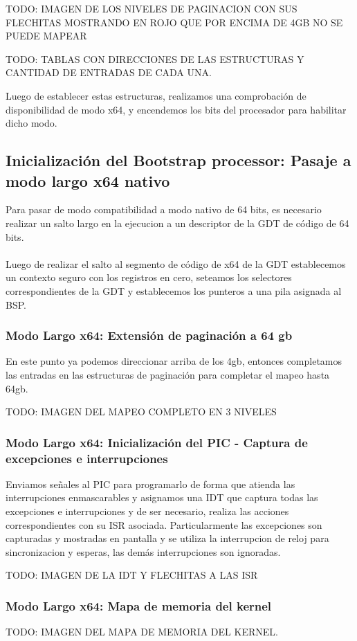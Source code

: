     TODO: IMAGEN DE LOS NIVELES DE PAGINACION CON SUS FLECHITAS MOSTRANDO EN ROJO QUE POR ENCIMA DE 4GB NO SE PUEDE MAPEAR

    TODO: TABLAS CON DIRECCIONES DE LAS ESTRUCTURAS Y CANTIDAD DE ENTRADAS DE CADA UNA.

	Luego de establecer estas estructuras, realizamos una comprobación de disponibilidad de modo x64, y encendemos los bits del procesador para habilitar dicho modo.

    \subsection{Inicialización del Bootstrap processor: Pasaje a modo largo x64 nativo}

    Para pasar de modo compatibilidad a modo nativo de 64 bits, es necesario realizar un salto largo en la ejecucion a un descriptor de la GDT de código de 64 bits.\\
    \\
    Luego de realizar el salto al segmento de código de x64 de la GDT establecemos un contexto seguro con los registros en cero, seteamos los selectores correspondientes de la GDT y establecemos los punteros a una pila asignada al BSP.

    \subsubsection{Modo Largo x64: Extensión de paginación a 64 gb}

    En este punto ya podemos direccionar arriba de los 4gb, entonces completamos las entradas en las estructuras de paginación para completar el mapeo hasta 64gb.

    TODO: IMAGEN DEL MAPEO COMPLETO EN 3 NIVELES

    \subsubsection{Modo Largo x64: Inicialización del PIC - Captura de excepciones e interrupciones}
	
    Enviamos señales al PIC para programarlo de forma que atienda las interrupciones enmascarables y asignamos una IDT que captura todas las excepciones e interrupciones y de ser necesario, realiza las acciones correspondientes con su ISR asociada. Particularmente las excepciones son capturadas y mostradas en pantalla y se utiliza la interrupcion de reloj para sincronizacion y esperas, las demás interrupciones son ignoradas.

    TODO: IMAGEN DE LA IDT Y FLECHITAS A LAS ISR

    \subsubsection{Modo Largo x64: Mapa de memoria del kernel}

    TODO: IMAGEN DEL MAPA DE MEMORIA DEL KERNEL.
